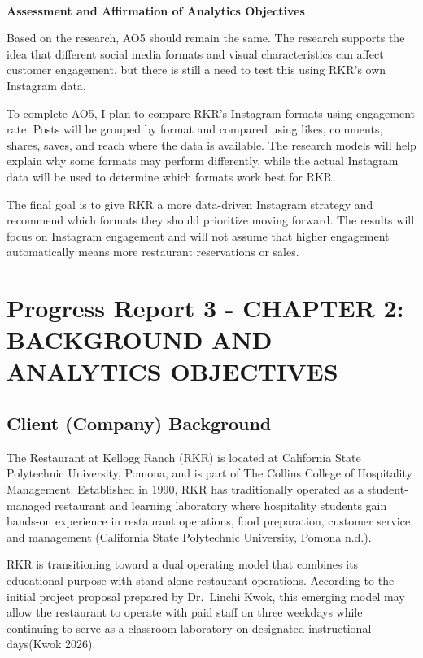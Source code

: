 \documentclass[
  12pt,
  letterpaper,
  DIV=11,
  numbers=noendperiod]{scrartcl}
\makeatletter
\let\oldparagraph\paragraph
\renewcommand{\paragraph}{
    \@ifstar
      \xxxParagraphStar
      \xxxParagraphNoStar
  }
\newcommand{\xxxParagraphStar}[1]{\oldparagraph*{#1}\mbox{}}
\newcommand{\xxxParagraphNoStar}[1]{\oldparagraph{#1}\mbox{}}
\makeatother
\begin{document}
\paragraph{\texorpdfstring{\textbf{Assessment and Affirmation of
Analytics
Objectives}}{Assessment and Affirmation of Analytics Objectives}}\label{assessment-and-affirmation-of-analytics-objectives-4}

Based on the research, AO5 should remain the same. The research supports
the idea that different social media formats and visual characteristics
can affect customer engagement, but there is still a need to test this
using RKR's own Instagram data.

To complete AO5, I plan to compare RKR's Instagram formats using
engagement rate. Posts will be grouped by format and compared using
likes, comments, shares, saves, and reach where the data is available.
The research models will help explain why some formats may perform
differently, while the actual Instagram data will be used to determine
which formats work best for RKR.

The final goal is to give RKR a more data-driven Instagram strategy and
recommend which formats they should prioritize moving forward. The
results will focus on Instagram engagement and will not assume that
higher engagement automatically means more restaurant reservations or
sales.

\section{Progress Report 3 - CHAPTER 2: BACKGROUND AND ANALYTICS
OBJECTIVES}\label{sec-ch2-background-and-analytics-objectives}

\subsection{Client (Company)
Background}\label{client-company-background}

The Restaurant at Kellogg Ranch (RKR) is located at California State
Polytechnic University, Pomona, and is part of The Collins College of
Hospitality Management. Established in 1990, RKR has traditionally
operated as a student-managed restaurant and learning laboratory where
hospitality students gain hands-on experience in restaurant operations,
food preparation, customer service, and management (California State
Polytechnic University, Pomona n.d.).

RKR is transitioning toward a dual operating model that combines its
educational purpose with stand-alone restaurant operations. According to
the initial project proposal prepared by Dr.~Linchi Kwok, this emerging
model may allow the restaurant to operate with paid staff on three
weekdays while continuing to serve as a classroom laboratory on
designated instructional days(Kwok 2026).
\end{document}
